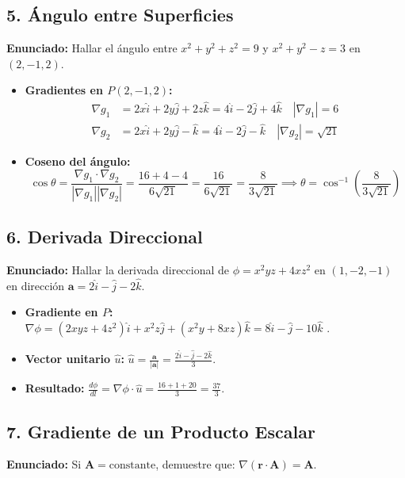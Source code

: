 \documentclass[a4paper]{article}
\begin{document}
\subsection*{5. Ángulo entre Superficies}
\textbf{Enunciado:} Hallar el ángulo entre $x^2 + y^2 + z^2 = 9$ y $x^2 + y^2 - z = 3$ en $(2, -1, 2)$.

\begin{itemize}
    \item \textbf{Gradientes en $P(2, -1, 2)$:} \cite{83}
    \begin{align*}
        \nabla g_1 &= 2x\hat{i} + 2y\hat{j} + 2z\hat{k} = 4\hat{i} - 2\hat{j} + 4\hat{k} \quad |\nabla g_1| = 6 \\
        \nabla g_2 &= 2x\hat{i} + 2y\hat{j} - \hat{k} = 4\hat{i} - 2\hat{j} - \hat{k} \quad |\nabla g_2| = \sqrt{21}
    \end{align*}
    \item \textbf{Coseno del ángulo:}
    \begin{equation}
        \cos \theta = \frac{\nabla g_1 \cdot \nabla g_2}{|\nabla g_1| |\nabla g_2|} = \frac{16 + 4 - 4}{6\sqrt{21}} = \frac{16}{6\sqrt{21}} = \frac{8}{3\sqrt{21}} \implies \theta = \cos^{-1}\left(\frac{8}{3\sqrt{21}}\right)
    \end{equation}
\end{itemize}

\subsection*{6. Derivada Direccional}
\textbf{Enunciado:} Hallar la derivada direccional de $\phi = x^2yz + 4xz^2$ en $(1, -2, -1)$ en dirección $\mathbf{a} = 2\hat{i} - \hat{j} - 2\hat{k}$.

\begin{itemize}
    \item \textbf{Gradiente en $P$:} $\nabla \phi = (2xyz + 4z^2)\hat{i} + x^2z\hat{j} + (x^2y + 8xz)\hat{k} = 8\hat{i} - \hat{j} - 10\hat{k}$ \cite{83}.
    \item \textbf{Vector unitario $\hat{u}$:} $\hat{u} = \frac{\mathbf{a}}{|\mathbf{a}|} = \frac{2\hat{i} - \hat{j} - 2\hat{k}}{3}$.
    \item \textbf{Resultado:} $\frac{d\phi}{dl} = \nabla \phi \cdot \hat{u} = \frac{16 + 1 + 20}{3} = \frac{37}{3}$.
\end{itemize}

\subsection*{7. Gradiente de un Producto Escalar}
\textbf{Enunciado:} Si $\mathbf{A} = \text{constante}$, demuestre que: $\nabla(\mathbf{r} \cdot \mathbf{A}) = \mathbf{A}$.
\end{document}
